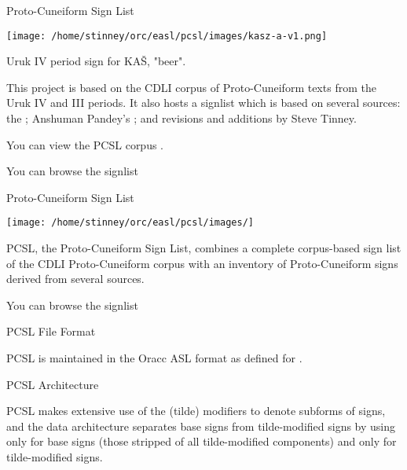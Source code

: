 \Hh{}Proto-Cuneiform Sign List

\bgroup\imagefloat{}\pc{}\texttt{[image: /home/stinney/orc/easl/pcsl/images/kasz-a-v1.png]}\bgroup\imagecaption{}
\par Uruk IV period sign for KAŠ, "beer".

\egroup
\egroup

\par This project is based on the CDLI corpus of Proto-Cuneiform
      texts from the Uruk IV and III periods. It also hosts a
      signlist which is based on several sources: the ; Anshuman
      Pandey's ; and
      revisions and additions by Steve Tinney.


\par You can view the PCSL corpus .


\par You can browse the signlist 

\Hh{}Proto-Cuneiform Sign List

\bgroup\imageinline{}\texttt{[image: /home/stinney/orc/easl/pcsl/images/]}\egroup

\par PCSL, the Proto-Cuneiform Sign List, combines a complete
      corpus-based sign list of the CDLI Proto-Cuneiform corpus with
      an inventory of Proto-Cuneiform signs derived from several
      sources.


\par You can browse the signlist 

\Hhhh{}PCSL File Format


\par PCSL is maintained in the Oracc ASL format as defined for
      .

\Hhhh{}PCSL Architecture


\par PCSL makes extensive use of the  (tilde) modifiers to denote subforms of
      signs, and the data architecture separates base signs from
      tilde-modified signs by using 
      only for base signs (those stripped of all tilde-modified
      components) and  only for
      tilde-modified signs.


